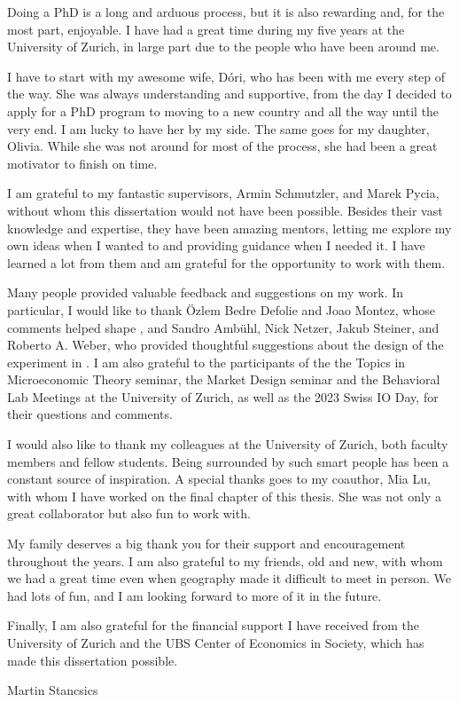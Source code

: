 Doing a PhD is a long and arduous process, but it is also rewarding and, for the most part, enjoyable.
I have had a great time during my five years at the University of Zurich, in large part due to the people who have been around me.

I have to start with my awesome wife, Dóri, who has been with me every step of the way.
She was always understanding and supportive, from the day I decided to apply for a PhD program to moving to a new country and all the way until the very end.
I am lucky to have her by my side.
The same goes for my daughter, Olivia.
While she was not around for most of the process, she had been a great motivator to finish on time.

I am grateful to my fantastic supervisors, Armin Schmutzler, and Marek Pycia, without whom this dissertation would not have been possible.
Besides their vast knowledge and expertise, they have been amazing mentors, letting me explore my own ideas when I wanted to and providing guidance when I needed it.
I have learned a lot from them and am grateful for the opportunity to work with them.

Many people provided valuable feedback and suggestions on my work.
In particular, I would like to thank Özlem Bedre Defolie and Joao Montez, whose comments helped shape , and Sandro Ambühl, Nick Netzer, Jakub Steiner, and Roberto A. Weber, who provided thoughtful suggestions about the design of the experiment in .
I am also grateful to the participants of the the Topics in Microeconomic Theory seminar, the Market Design seminar and the Behavioral Lab Meetings at the University of Zurich, as well as the 2023 Swiss IO Day, for their questions and comments.

I would also like to thank my colleagues at the University of Zurich, both faculty members and fellow students.
Being surrounded by such smart people has been a constant source of inspiration.
A special thanks goes to my coauthor, Mia Lu, with whom I have worked on the final chapter of this thesis.
She was not only a great collaborator but also fun to work with.

My family deserves a big thank you for their support and encouragement throughout the years.
I am also grateful to my friends, old and new, with whom we had a great time even when geography made it difficult to meet in person.
We had lots of fun, and I am looking forward to more of it in the future.

Finally, I am also grateful for the financial support I have received from the University of Zurich and the UBS Center of Economics in Society, which has made this dissertation possible.

\vspace{0.5 cm}\hfill Martin Stancsics
